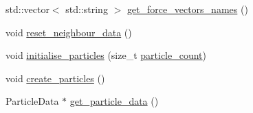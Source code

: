 \begin{DoxyCompactItemize}
\item 
std\+::vector$<$ std\+::string $>$ \mbox{\hyperlink{namespacewash_ae42fc803544c64f176f65f72e0fc1fe0}{get\+\_\+force\+\_\+vectors\+\_\+names}} ()
\item 
void \mbox{\hyperlink{namespacewash_aaa0505290c83069eeb4f67744d4b8f1e}{reset\+\_\+neighbour\+\_\+data}} ()
\item 
void \mbox{\hyperlink{namespacewash_a0bc7b17c64c2b0f7bdd6c7c2d30f2398}{initialise\+\_\+particles}} (size\+\_\+t \mbox{\hyperlink{namespacewash_a7845fa82d1b536c12c2d9495ede361ca}{particle\+\_\+count}})
\item 
void \mbox{\hyperlink{namespacewash_a34943cddac15887cbaca01af7ca106c5}{create\+\_\+particles}} ()
\item 
Particle\+Data $\ast$ \mbox{\hyperlink{namespacewash_aa3671e8d906a2f71aa6a17ce42029ad5}{get\+\_\+particle\+\_\+data}} ()
\end{DoxyCompactItemize}
